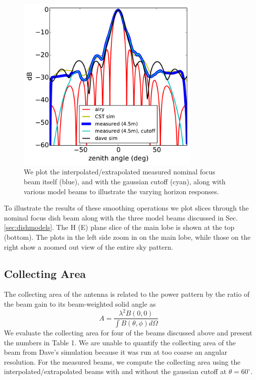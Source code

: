\documentclass[preprint]{aastex}
\begin{document}
\begin{figure}[h]
\includegraphics[width=3.5in]{ew_beams_slice.pdf}
\caption{We plot the interpolated/extrapolated measured nominal focus  beam itself (blue), and with the gaussian cutoff (cyan), along with various model beams to illustrate the varying horizon responses. }
\label{fig:interpbeamsslice}
\end{figure}

To illustrate the results of these smoothing operations we plot slices through the nominal focus dish beam along with the three model beams discussed in Sec. \ref{sec:dishmodels}. The H (E) plane slice of the main lobe is shown at the top (bottom). The plots in the left side zoom in on the main lobe, while those on the right show a zoomed out view of the entire sky pattern. 

\subsection{Collecting Area}

The collecting area of the antenna is related to the power pattern by the ratio of the beam gain to its beam-weighted solid angle as
\begin{equation}
	A=\frac{\lambda^2 B(0,0)}{\int B(\theta,\phi)d\Omega}
\end{equation}
We evaluate the collecting area for four of the beams discussed above and present the numbers in Table 1. We are unable to quantify the collecting area of the beam from Dave's simulation because it was run at too coarse an angular resolution. For the measured beams, we compute the collecting area using the interpolated/extrapolated beams with and without the gaussian cutoff at $\theta=60^\circ$.
\end{document}
